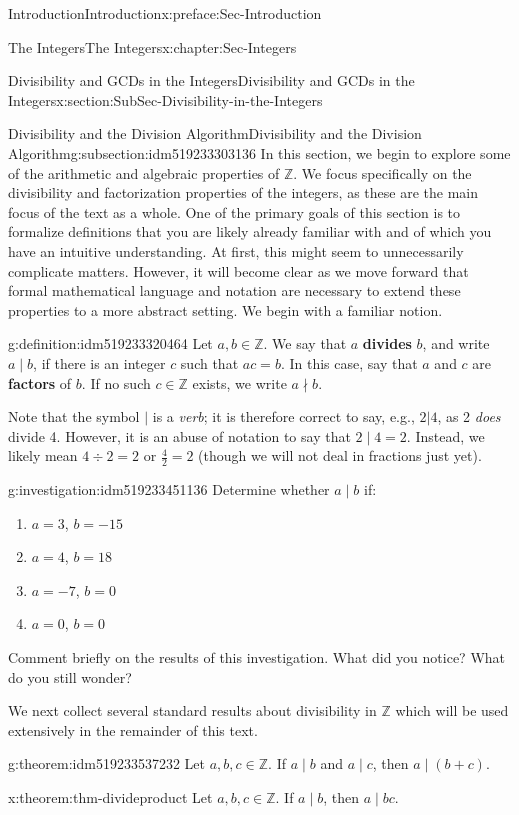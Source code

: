 \documentclass[oneside,10pt,]{book}
\newcommand{\terminology}[1]{\textbf{#1}}
\numberwithin{equation}{section}
\def\Z{{\mathbb Z}}
\begin{document}
\begin{preface}{Introduction}{}{Introduction}{}{}{x:preface:Sec-Introduction}
\begin{chapterptx}{The Integers}{}{The Integers}{}{}{x:chapter:Sec-Integers}
\begin{sectionptx}{Divisibility and GCDs in the Integers}{}{Divisibility and GCDs in the Integers}{}{}{x:section:SubSec-Divisibility-in-the-Integers}
\begin{subsectionptx}{Divisibility and the Division Algorithm}{}{Divisibility and the Division Algorithm}{}{}{g:subsection:idm519233303136}
In this section, we begin to explore some of the arithmetic and algebraic properties of \(\Z\). We focus specifically on the divisibility and factorization properties of the integers, as these are the main focus of the text as a whole. One of the primary goals of this section is to formalize definitions that you are likely already familiar with and of which you have an intuitive understanding. At first, this might seem to unnecessarily complicate matters. However, it will become clear as we move forward that formal mathematical language and notation are necessary to extend these properties to a more abstract setting. We begin with a familiar notion.%
\begin{definition}{}{g:definition:idm519233320464}%
%
%
Let \(a,b\in \Z\). We say that \(a\) \terminology{divides} \(b\), and write \(a\mid b\), if there is an integer \(c\) such that \(ac = b\). In this case, say that \(a\) and \(c\) are \terminology{factors} of \(b\). If no such \(c\in \Z\) exists, we write \(a\nmid b\).%
\end{definition}
Note that the symbol \(|\) is a \emph{verb}; it is therefore correct to say, e.g., \(2|4\), as 2 \emph{does} divide 4. However, it is an abuse of notation to say that \(2\mid 4 = 2\). Instead, we likely mean \(4\div 2 = 2\) or \(\frac{4}{2} = 2\) (though we will not deal in fractions just yet).%
\begin{investigation}{}{g:investigation:idm519233451136}%
Determine whether \(a\mid b\) if:%
\begin{enumerate}
\item{}\(a = 3\), \(b = -15\)%
\item{}\(a = 4\), \(b = 18\)%
\item{}\(a = -7\), \(b = 0\)%
\item{}\(a = 0\), \(b = 0\)%
\end{enumerate}
Comment briefly on the results of this investigation. What did you notice? What do you still wonder?%
\end{investigation}
We next collect several standard results about divisibility in \(\Z\) which will be used extensively in the remainder of this text.%
\begin{theorem}{}{}{g:theorem:idm519233537232}%
Let \(a,b,c\in\Z\). If \(a\mid b\) and \(a\mid c\), then \(a\mid (b+c)\).%
\end{theorem}
\begin{theorem}{}{}{x:theorem:thm-divideproduct}%
Let \(a,b,c\in\Z\). If \(a\mid b\), then \(a\mid bc\).%

\end{theorem}
\end{subsectionptx}
\end{sectionptx}
\end{chapterptx}
\end{preface}
\end{document}
